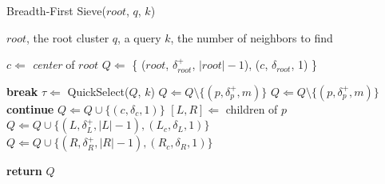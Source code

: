 \begin{minipage}{0.5125\textwidth}
    \begin{algorithm}[H]\small
        \caption{Breadth-First Sieve($root$, $q$, $k$)} %
        \label{alg:methods:bredth-first-sieve} %
        \begin{algorithmic} %
            \Require $root$, the root cluster
            \Require $q$, a query
            \Require $k$, the number of neighbors to find

            \State $c \Leftarrow$ \textit{center} of $root$
            \State $Q \Leftarrow$ \{ ($root$, $\delta^{+}_{root}$, $|root| - 1$), ($c$, $\delta_{root}$, 1) \}

            \Loop
                    \State \textbf{break}
                \EndIf
                \State $\tau \Leftarrow$ QuickSelect($Q$, $k$)
                        \State $Q \Leftarrow Q \setminus \{ (p, \delta^{+}_{p}, m) \}$
                    \EndIf
                \EndFor
                    \State $Q \Leftarrow Q \setminus \{ (p, \delta^{+}_{p}, m) \}$
                        \State \textbf{continue}
                            \State $Q \Leftarrow Q \cup \{ (c, \delta_{c}, 1) \}$
                        \EndFor
                    \Else
                        \State $[L, R] \Leftarrow$ children of $p$
                        \State $Q \Leftarrow Q \cup \{ (L, \delta^{+}_{L}, |L| - 1), (L_c, \delta_{L}, 1) \}$
                        \State $Q \Leftarrow Q \cup \{ (R, \delta^{+}_{R}, |R| - 1), (R_c, \delta_{R}, 1) \}$
                    \EndIf
                \EndFor
            \EndLoop

            \State \textbf{return} $Q$
        \end{algorithmic}
    \end{algorithm}
\end{minipage}
\hfill
